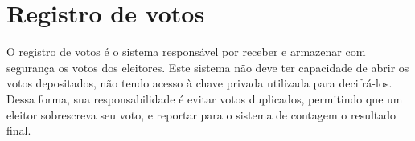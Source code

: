 \section{Registro de votos}

O registro de votos é o sistema responsável por receber e armazenar com segurança os votos dos eleitores. Este sistema não deve ter capacidade de abrir os votos depositados, não tendo acesso à chave privada utilizada para decifrá-los. Dessa forma, sua responsabilidade é evitar votos duplicados, permitindo que um eleitor sobrescreva seu voto, e reportar para o sistema de contagem o resultado final.
